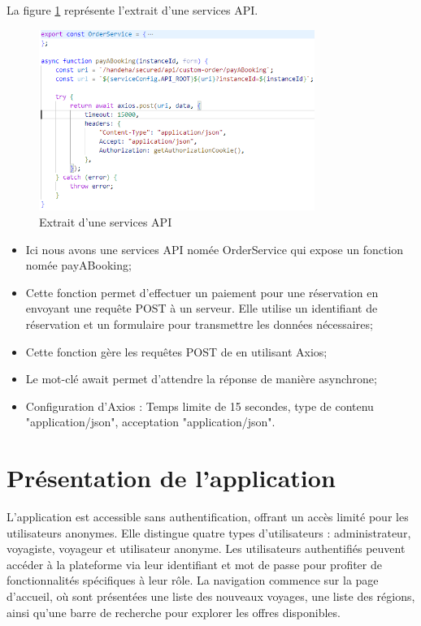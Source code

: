 \documentclass[12pt]{report}
\begin{document}
			La figure \ref{fig:serviceAPI} représente l'extrait d'une services API.
			
			\begin{figure}[h]
				\centering
				\includegraphics[width=0.8\textwidth]{serviceAPI.jpg}
				\caption{Extrait d'une services API}
				\label{fig:serviceAPI}
			\end{figure}
			\FloatBarrier

			\begin{itemize}
				\item Ici nous avons une services API nomée OrderService qui expose un fonction nomée payABooking;
				\item Cette fonction permet d'effectuer un paiement pour une réservation en envoyant une requête POST à un serveur. Elle utilise un identifiant de réservation et un formulaire pour transmettre les données nécessaires;
				\item Cette fonction gère les requêtes POST de en utilisant Axios;
				\item Le mot-clé await permet d'attendre la réponse de manière asynchrone;	
				\item Configuration d’Axios : Temps limite de 15 secondes, type de contenu "application/json", acceptation "application/json".
			\end{itemize}
			


			\section{Présentation de l’application}
			
			\hspace{15pt} L'application est accessible sans authentification, offrant un accès limité pour les utilisateurs anonymes. Elle distingue quatre types d'utilisateurs : administrateur, voyagiste, voyageur et utilisateur anonyme. Les utilisateurs authentifiés peuvent accéder à la plateforme via leur identifiant et mot de passe pour profiter de fonctionnalités spécifiques à leur rôle. La navigation commence sur la page d'accueil, où sont présentées une liste des nouveaux voyages, une liste des régions, ainsi qu'une barre de recherche pour explorer les offres disponibles.\\
\end{document}
